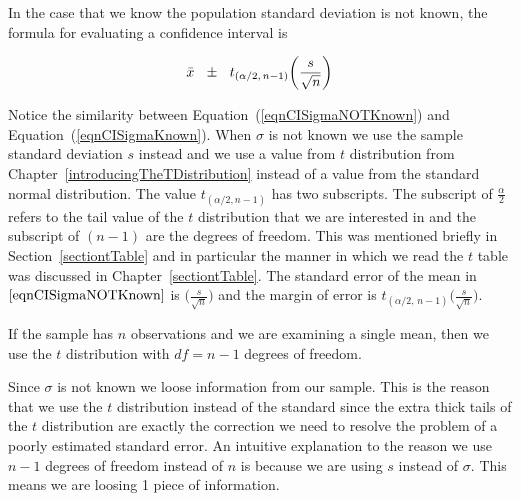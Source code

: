 In the case that we know the population standard deviation is not known, the formula for evaluating a
confidence interval is 

\begin{termBox}{
\begin{equation}
\bar{x}	~~ \pm ~~		t_{(\alpha / 2, \, n-1)}  \bigg( \frac{ s }{ \sqrt{n} } \bigg)\label{eqnCISigmaNOTKnown}	\\
\end{equation}
}
\end{termBox}

Notice the similarity between Equation~(\ref{eqnCISigmaNOTKnown}) and Equation~(\ref{eqnCISigmaKnown}).
When $\sigma$ is not known we use the sample standard deviation $s$ instead and
we use a value from $t$ distribution from Chapter~\ref{introducingTheTDistribution} instead of
a value from the standard normal distribution.
The value $t_{(\alpha / 2, n-1)}$ has two subscripts.
The subscript of $\frac{\alpha}{2}$ refers to the tail value of the $t$ distribution that we 
are interested in and the subscript of $(n-1)$ are the degrees of freedom.
This was mentioned briefly in Section~\ref{sectiontTable}
and in particular 
the manner in which we read the $t$ table was discussed in Chapter~\ref{sectiontTable}.
The standard error of the mean in $\ref{eqnCISigmaNOTKnown}$
is $\big( \frac{ s }{ \sqrt{n} } \big)$
and the margin of error is
$t_{(\alpha / 2, \, n-1)}  \big( \frac{ s }{ \sqrt{n} } \big)$.



\begin{termBox}{
If the sample has $n$ observations and we are examining a single mean, then we use the $t$ distribution with $df=n-1$ degrees of freedom.}
\end{termBox}



Since $\sigma$ is not known we loose information from our sample.
This is the reason that we use the $t$ distribution instead of the standard since
the extra thick tails of the $t$ distribution are exactly the correction we need to resolve the problem of a poorly estimated standard error.
An intuitive explanation to the reason
we use $n-1$ degrees of freedom instead of $n$ is because we are using $s$ instead of $\sigma$.
This means we are loosing 1 piece of information.


